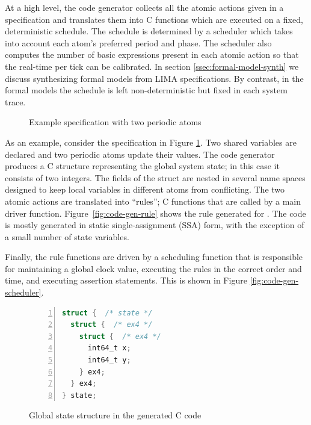 At a high level, the code generator collects all the atomic actions given in
a specification and translates them into C functions which are executed on a
fixed, deterministic schedule. The schedule is determined by a scheduler which
takes into account each atom's preferred period and phase. The scheduler also
computes the number of basic expressions present in each atomic action so that
the real-time per tick can be calibrated. In section
\ref{ssec:formal-model-synth} we discuss synthesizing formal models from LIMA
specifications. By contrast, in the formal models the schedule is left
non-deterministic but fixed in each system trace.

\begin{figure}
\caption{Example specification with two periodic atoms}
\label{fig:code-gen-example}
\end{figure}

As an example, consider the specification in Figure
\ref{fig:code-gen-example}. Two shared variables are declared and two
periodic atoms update their values. The code generator produces a C
structure representing the global system state; in this case it
consists of two integers. The fields of the struct are nested in
several name spaces designed to keep local variables in different
atoms from conflicting. The two atomic actions are translated into
``rules''; C functions that are called by a main driver
function. Figure~\ref{fig:code-gen-rule} shows the rule generated for
. The code is mostly generated in static single-assignment
(SSA) form, with the exception of a small number of state variables.

Finally, the rule functions are driven by a scheduling function
that is responsible for maintaining a global clock value, executing the rules
in the correct order and time, and executing assertion statements. This is
shown in Figure \ref{fig:code-gen-scheduler}.

\begin{figure}
    \begin{lstlisting}[language=C,
                       numbers=left,
                       numberstyle=\scriptsize,
                       stepnumber=1,
                       numbersep=8pt,
                       showstringspaces=false,
                       breaklines=true,
                       frame=single]
struct {  /* state */
  struct {  /* ex4 */
    struct {  /* ex4 */
      int64_t x;
      int64_t y;
    } ex4;
  } ex4;
} state;
    \end{lstlisting}
    \caption{Global state structure in the generated C code}
    \label{fig:code-gen-state-struct}
\end{figure}


